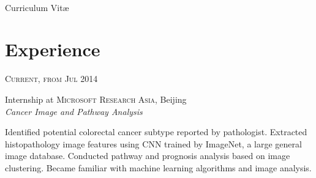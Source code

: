 \documentclass[10pt, a4paper]{article} %
\begin{document}
\color{text1} %




\par{\\ %
{\color{headings} Curriculum {Vit\ae}\\[15pt]\par} %


\begin{minipage}[t]{0.5\textwidth} %
\vspace{0pt} %


\section{Experience}


{\raggedleft\textsc{Current, from Jul 2014}\par}

{\raggedright\large Internship at \textsc{Microsoft Research Asia}, Beijing\\
\textit{Cancer Image and Pathway Analysis}\\[5pt]}

\normalsize{Identified potential colorectal cancer subtype reported by pathologist. Extracted histopathology image features using CNN trained by ImageNet, a large general image database. Conducted pathway and prognosis analysis based on image clustering. Became familiar with machine learning algorithms and image analysis.}\\


\end{minipage}}
\end{document}
